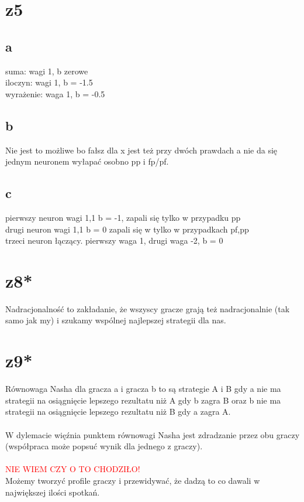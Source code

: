 \documentclass{article}
\begin{document}
\section{z5}
\subsection*{a}
suma: wagi 1, b zerowe\\
iloczyn: wagi 1, b = -1.5\\
wyrażenie: waga 1, b = -0.5\\
\subsection*{b}
Nie jest to możliwe bo fałsz dla x jest też przy dwóch prawdach a nie da się jednym neuronem wyłapać osobno pp i fp/pf.
\subsection*{c}
pierwszy neuron wagi 1,1 b = -1, zapali się tylko w przypadku pp\\
drugi neuron wagi 1,1 b = 0 zapali się w tylko w przypadkach pf,pp\\
trzeci neuron łączący. pierwszy waga 1, drugi waga -2, b = 0\\
\section{z8*}
Nadracjonalność to zakładanie, że wszyscy gracze grają też nadracjonalnie (tak samo jak my) i szukamy wspólnej najlepszej strategii dla nas.
\section{z9*}
Równowaga Nasha dla gracza a i gracza b to są strategie A i B gdy a nie ma strategii na osiągnięcie lepszego rezultatu niż A gdy b zagra B oraz b nie ma strategii na osiągnięcie lepszego rezultatu niż B gdy a zagra A.\\\\
W dylemacie więźnia punktem równowagi Nasha jest zdradzanie przez obu graczy (współpraca może popsuć wynik dla jednego z graczy).\\\\
\textcolor{red}{NIE WIEM CZY O TO CHODZIŁO!}\\
Możemy tworzyć profile graczy i przewidywać, że dadzą to co dawali w największej ilości spotkań.
\end{document}
